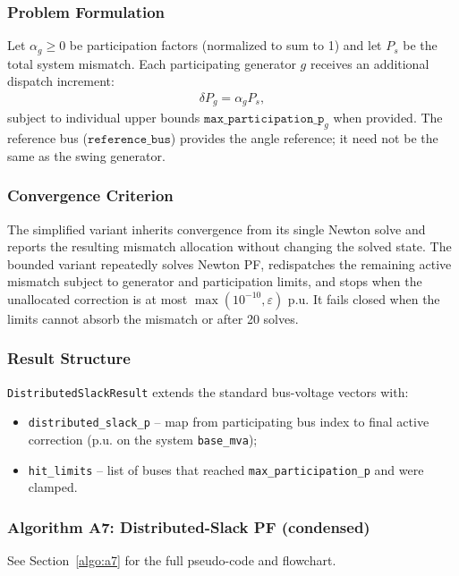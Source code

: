 \subsubsection{Problem Formulation}

Let $\alpha_g \ge 0$ be participation factors (normalized to sum to 1) and let
$P_s$ be the total system mismatch.  Each participating generator $g$ receives
an additional dispatch increment:
\begin{align}
\delta P_g = \alpha_g P_s,
\end{align}
subject to individual upper bounds \(\texttt{max\_participation\_p}_g\) when
provided.  The reference bus ($\texttt{reference\_bus}$) provides the angle
reference; it need not be the same as the swing generator.

\subsubsection{Convergence Criterion}

The simplified variant inherits convergence from its single Newton solve and
reports the resulting mismatch allocation without changing the solved state.
The bounded variant repeatedly solves Newton PF, redispatches the remaining
active mismatch subject to generator and participation limits, and stops when
the unallocated correction is at most \(\max(10^{-10},\varepsilon)\) p.u.  It
fails closed when the limits cannot absorb the mismatch or after 20 solves.

\subsubsection{Result Structure}

\texttt{DistributedSlackResult} extends the standard bus-voltage vectors with:
\begin{itemize}
  \item \texttt{distributed\_slack\_p} -- map from participating bus index to
  final active correction (p.u. on the system \texttt{base\_mva});
  \item \texttt{hit\_limits} -- list of buses that reached
  \texttt{max\_participation\_p} and were clamped.
\end{itemize}

\subsubsection{Algorithm A7: Distributed-Slack PF (condensed)}
\label{algo:a7-inline}
See Section~\ref{algo:a7} for the full pseudo-code and flowchart.

